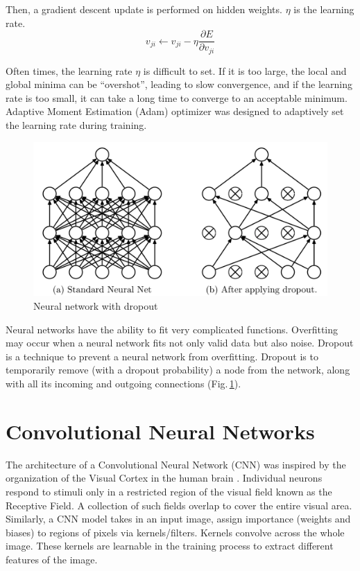 Then, a gradient descent update is performed on hidden weights. $\eta$ is the learning rate.
$$v_{ji} \leftarrow v_{ji} - \eta \frac{\partial E}{\partial v_{ji}}$$

Often times, the learning rate $\eta$ is difficult to set. If it is too large, the local and global minima can be “overshot”, leading to slow convergence, and if the learning rate is too small, it can take a long time to converge to an acceptable minimum. Adaptive Moment Estimation (Adam) \citep{adam} optimizer was designed to adaptively set the learning rate during training.

\begin{figure}[h]
	\centering
	\includegraphics[scale=0.4]{Figs/dropout.png}
    \caption{Neural network with dropout \citep{JMLR:v15:srivastava14a}}
    \label{dropout}
\end{figure}

Neural networks have the ability to fit very complicated functions. Overfitting may occur when a neural network fits not only valid data but also noise. Dropout \citep{JMLR:v15:srivastava14a} is a technique to prevent a neural network from overfitting. Dropout is to temporarily remove (with a dropout probability) a node from the network, along with all its incoming and outgoing connections (Fig.\,\ref{dropout}).


\section{Convolutional Neural Networks}
The architecture of a Convolutional Neural Network (CNN) was inspired by the organization of the Visual Cortex in the human brain \citep{Fukushima2007}. Individual neurons respond to stimuli only in a restricted region of the visual field known as the Receptive Field. A collection of such fields overlap to cover the entire visual area. Similarly, a CNN model takes in an input image, assign importance (weights and biases) to regions of pixels via kernels/filters. Kernels convolve across the whole image. These kernels are learnable in the training process to extract different features of the image.

